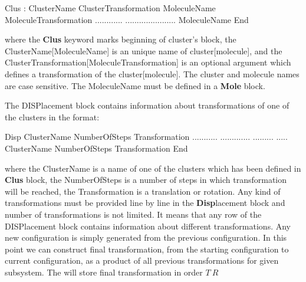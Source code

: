\begin{keywordlist}
\begin{sourcelisting}
   Clus : ClusterName  ClusterTransformation
     MoleculeName  MoleculeTransformation
     ............  ......................
     MoleculeName
   End
\end{sourcelisting}
where the {\bf Clus} keyword marks beginning of cluster's block, the ClusterName[MoleculeName] is an unique name of cluster[molecule], and the ClusterTransformation[MoleculeTransformation] is an optional argument which defines a transformation of the cluster[molecule]. The cluster and molecule names are case sensitive. The MoleculeName must be defined in a {\bf Mole} block.

The DISPlacement block contains information about transformations of one of the clusters in the format:\\

\begin{sourcelisting}
   Disp
    ClusterName  NumberOfSteps Transformation
    ...........  ............. ......... .....
    ClusterName  NumberOfSteps Transformation
   End
\end{sourcelisting}
where the ClusterName is a name of one of the clusters which has been defined in {\bf Clus} block, the NumberOfSteps is a number of steps in which transformation will be reached, the Transformation  is a translation or rotation. Any kind of transformations must be provided line by line in the {\bf Disp}lacement block and number of transformations is not limited. It means that any row of the DISPlacement block contains information about different transformations. Any new configuration is simply generated from the previous configuration. In this point we can construct final transformation, from the starting configuration to current configuration, as a product of all previous transformations for given subsystem. The  will store final transformation in order $T\ R$


\end{keywordlist}

